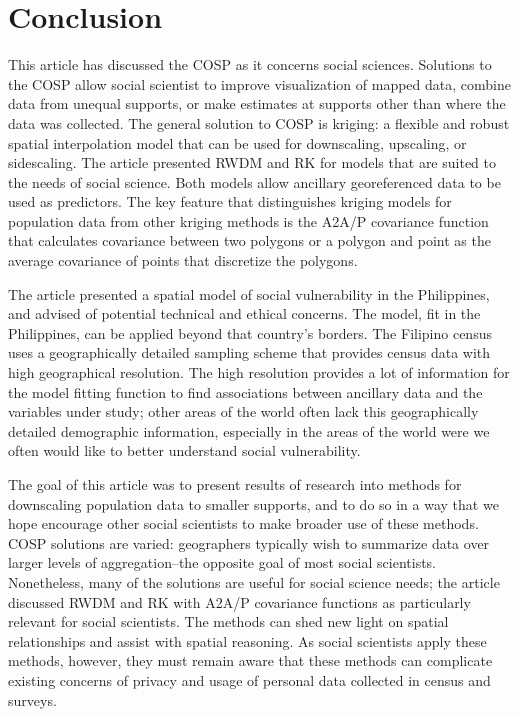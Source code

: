 \documentclass[draft]{article}
\begin{document}
\section{Conclusion}

This article has discussed the COSP as it concerns social sciences.  Solutions to the COSP allow social scientist to improve visualization of mapped data, combine data from unequal supports, or make estimates at supports other than where the data was collected.  The general solution to COSP is kriging: a flexible and robust spatial interpolation model that can be used for downscaling, upscaling, or sidescaling.  The article presented RWDM and RK for models that are suited to the needs of social science.  Both models allow ancillary georeferenced data to be used as predictors.  The key feature that distinguishes kriging models for population data from other kriging methods is the A2A/P covariance function that calculates covariance between two polygons or a polygon and point as the average covariance of points that discretize the polygons.

The article presented a spatial model of social vulnerability in the Philippines, and advised of potential technical and ethical concerns.  The model, fit in the Philippines, can be applied beyond that country's borders.  The Filipino census uses a geographically detailed sampling scheme that provides census data with high geographical resolution.  The high resolution provides a lot of information for the model fitting function to find associations between ancillary data and the variables under study; other areas of the world often lack this geographically detailed demographic information, especially in the areas of the world were we often would like to better understand social vulnerability.

The goal of this article was to present results of research into methods for downscaling population data to smaller supports, and to do so in a way that we hope encourage other social scientists to make broader use of these methods.  COSP solutions are varied: geographers typically wish to summarize data over larger levels of aggregation--the opposite goal of most social scientists.  Nonetheless, many of the solutions are useful for social science needs; the article discussed RWDM and RK with A2A/P covariance functions as particularly relevant for social scientists.  The methods can shed new light on spatial relationships and assist with spatial reasoning.  As social scientists apply these methods, however, they must remain aware that these methods can complicate existing concerns of privacy and usage of personal data collected in census and surveys.


\end{document}
